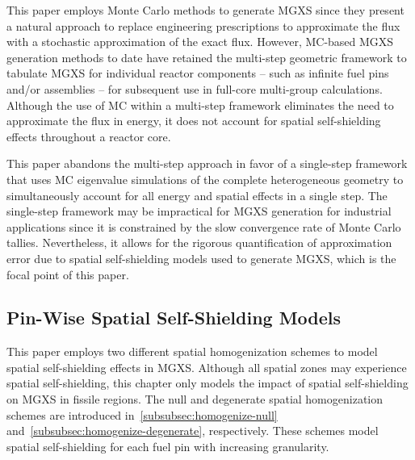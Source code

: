 This paper employs Monte Carlo methods to generate MGXS since they present a natural approach to replace engineering prescriptions to approximate the flux with a stochastic approximation of the exact flux. However, MC-based MGXS generation methods to date have retained the multi-step geometric framework to tabulate MGXS for individual reactor components -- such as infinite fuel pins and/or assemblies -- for subsequent use in full-core multi-group calculations. Although the use of MC within a multi-step framework eliminates the need to approximate the flux in energy, it does not account for spatial self-shielding effects throughout a reactor core. 

This paper abandons the multi-step approach in favor of a single-step framework that uses MC eigenvalue simulations of the complete heterogeneous geometry to simultaneously account for all energy and spatial effects in a single step. The single-step framework may be impractical for MGXS generation for industrial applications since it is constrained by the slow convergence rate of Monte Carlo tallies. Nevertheless, it allows for the rigorous quantification of approximation error due to spatial self-shielding models used to generate MGXS, which is the focal point of this paper.


\subsection{Pin-Wise Spatial Self-Shielding Models}
\label{subsec:homogenize}


This paper employs two different spatial homogenization schemes to model spatial self-shielding effects in MGXS. Although all spatial zones may experience spatial self-shielding, this chapter only models the impact of spatial self-shielding on MGXS in fissile regions. The null and degenerate spatial homogenization schemes are introduced in~\autoref{subsubsec:homogenize-null} and~\autoref{subsubsec:homogenize-degenerate}, respectively. These schemes model spatial self-shielding for each fuel pin with increasing granularity. 


